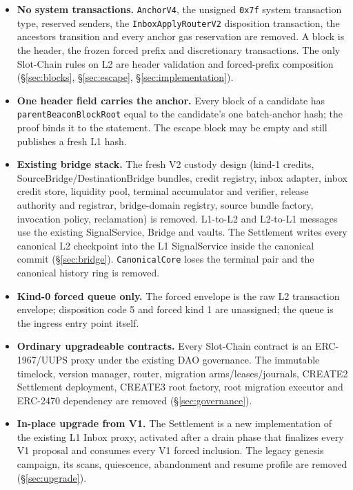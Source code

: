 \documentclass[a4paper,11pt]{article}
\newcommand{\code}[1]{\nolinkurl{#1}}
\begin{document}
\begin{itemize}
\item \textbf{No system transactions.}  \code{AnchorV4}, the unsigned
  \code{0x7f} system transaction type, reserved senders, the
  \code{InboxApplyRouterV2} disposition transaction, the ancestors transition
  and every anchor gas reservation are removed.  A block is the header, the
  frozen forced prefix and discretionary transactions.  The only Slot-Chain
  rules on L2 are header validation and forced-prefix composition
  (\S\ref{sec:blocks}, \S\ref{sec:escape}, \S\ref{sec:implementation}).
\item \textbf{One header field carries the anchor.}  Every block of a
  candidate has \code{parentBeaconBlockRoot} equal to the candidate's one
  batch-anchor hash; the proof binds it to the statement.  The escape block
  may be empty and still publishes a fresh L1 hash.
\item \textbf{Existing bridge stack.}  The fresh V2 custody design (kind-1
  credits, SourceBridge/DestinationBridge bundles, credit registry, inbox
  adapter, inbox credit store, liquidity pool, terminal accumulator and
  verifier, release authority and registrar, bridge-domain registry, source
  bundle factory, invocation policy, reclamation) is removed.  L1-to-L2 and
  L2-to-L1 messages use the existing SignalService, Bridge and vaults.  The
  Settlement writes every canonical L2 checkpoint into the L1 SignalService
  inside the canonical commit (\S\ref{sec:bridge}).  \code{CanonicalCore}
  loses the terminal pair and the canonical history ring is removed.
\item \textbf{Kind-0 forced queue only.}  The forced envelope is the raw L2
  transaction envelope; disposition code 5 and forced kind 1 are unassigned;
  the queue is the ingress entry point itself.
\item \textbf{Ordinary upgradeable contracts.}  Every Slot-Chain contract is an
  ERC-1967/UUPS proxy under the existing DAO governance.  The immutable
  timelock, version manager, router, migration arms/leases/journals, CREATE2
  Settlement deployment, CREATE3 root factory, root migration executor and
  ERC-2470 dependency are removed (\S\ref{sec:governance}).
\item \textbf{In-place upgrade from V1.}  The Settlement is a new
  implementation of the existing L1 Inbox proxy, activated after a drain phase
  that finalizes every V1 proposal and consumes every V1 forced inclusion.
  The legacy genesis campaign, its scans, quiescence, abandonment and resume
  profile are removed (\S\ref{sec:upgrade}).
\end{itemize}
\end{document}
